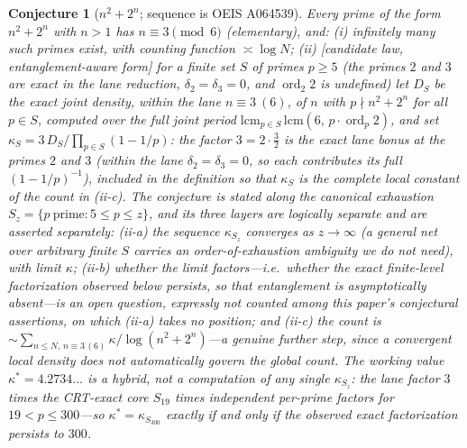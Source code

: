 \documentclass[11pt]{article}
\newtheorem{conjecture}{Conjecture}
\theoremstyle{definition}
\DeclareMathOperator{\ord}{ord}
\begin{document}
\setcounter{conjecture}{5}%
\begin{conjecture}[{$n^2+2^n$}; sequence is OEIS A064539]\label{c11}
Every prime of the form $n^2+2^n$ with $n>1$ has $n\equiv3\pmod6$
(elementary), and:
\emph{(i)} infinitely many such primes exist, with counting function
$\asymp\log N$;
\emph{(ii)} [candidate law, entanglement-aware form] for a finite set
$S$ of primes $p\ge5$ (the primes $2$ and $3$ are exact in the lane
reduction, $\delta_2=\delta_3=0$, and $\ord_2 2$ is undefined) let
$D_S$ be the \emph{exact} joint density,
within the lane $n\equiv3\ (6)$, of $n$ with $p\nmid n^2+2^n$ for all
$p\in S$, computed over the full joint period
$\mathrm{lcm}_{p\in S}\,\mathrm{lcm}(6,\,p\cdot\ord_p2)$, and set
$\kappa_S=3\,D_S/\prod_{p\in S}(1-1/p)$: the factor
$3=2\cdot\tfrac32$ is the exact lane bonus at the primes $2$ and $3$
(within the lane $\delta_2=\delta_3=0$, so each contributes its full
$(1-1/p)^{-1}$), included in the definition so that $\kappa_S$ is the
complete local constant of the count in (ii-c).  The conjecture is stated
along the \emph{canonical exhaustion} $S_z=\{p\ \text{prime}:5\le
p\le z\}$, and its three layers are logically separate and are
asserted separately:
\emph{(ii-a)} the sequence $\kappa_{S_z}$ converges as
$z\to\infty$ (a general net over arbitrary finite $S$ carries an
order-of-exhaustion ambiguity we do not need), with limit $\kappa$;
\emph{(ii-b)} whether the limit \emph{factors}---i.e.\ whether the
exact finite-level factorization observed below persists, so that
entanglement is asymptotically absent---is an \emph{open question},
expressly not counted among this paper's conjectural assertions, on which
(ii-a) takes no position; and
\emph{(ii-c)} the count is
$\sim\sum_{n\le N,\,n\equiv3\,(6)}\kappa/\log(n^2+2^n)$---a genuine
further step, since a convergent local density does not
automatically govern the global count.  The working
value $\kappa^{*}=4.2734\ldots$ is a \emph{hybrid}, not a
computation of any single $\kappa_{S_z}$: the lane factor $3$ times
the CRT-exact core
$S_{19}$ times independent per-prime factors for $19<p\le300$---so
$\kappa^{*}=\kappa_{S_{300}}$ exactly if and only if the observed
exact factorization persists to $300$.
\end{conjecture}
\end{document}
